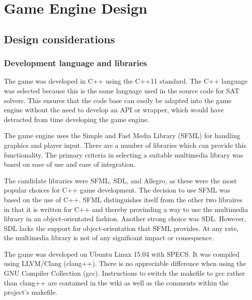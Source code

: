 \documentclass[11pt, a4paper, oneside]{report} %
\begin{document}

\chapter{Game Engine Design}

\section{Design considerations}

\subsection{Development language and libraries}

The game was developed in C++ using the C++11 standard. The C++ language was
selected because this is the same language used in the source code for SAT
solvers. This ensures that the code base can easily be adapted into the game
engine without the need to develop an API or wrapper, which would have detracted
from time developing the game engine.

The game engine uses the Simple and Fast Media Library (SFML) for handling
graphics and player input. There are a number of libraries which can provide this
functionality. The primary criteria in selecting a suitable multimedia library
was based on ease of use and ease of integration. 

The candidate libraries were SFML, SDL, and Allegro, as these were the most
popular choices for C++ game development. The decision to use SFML was based on
the use of C++. SFML distinguishes itself from the other two libraires in that
it is written for C++ and thereby provinding a way to use the multimedia library
in an object-orientated fashion. Another strong choice was SDL. However, SDL
lacks the support for object-orientation that SFML provides. At any rate, the
multimedia library is not of any significant impact or consequence.

The game was developed on Ubuntu Linux 15.04 with SPECS. It was compiled using
LLVM/Clang (clang++). There is no appreciable difference when using the GNU
Compiler Collection (gcc). Instructions to switch the makefile to gcc rather
than clang++ are contained in the wiki as well as the comments within the
project's makefile.
\end{document}
